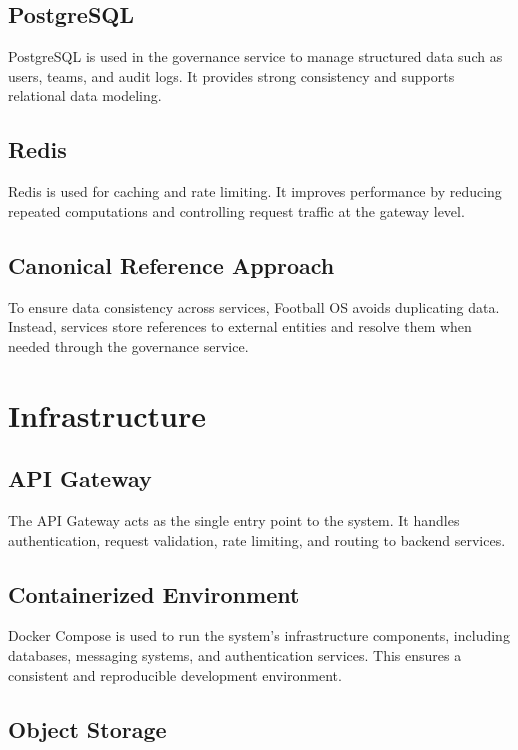 \subsection{PostgreSQL}

PostgreSQL is used in the governance service to manage structured data
such as users, teams, and audit logs. It provides strong consistency
and supports relational data modeling.

\subsection{Redis}

Redis is used for caching and rate limiting. It improves performance by
reducing repeated computations and controlling request traffic at the
gateway level.

\subsection{Canonical Reference Approach}

To ensure data consistency across services, Football OS avoids duplicating
data. Instead, services store references to external entities and resolve
them when needed through the governance service.

\section{Infrastructure}

\subsection{API Gateway}

The API Gateway acts as the single entry point to the system. It handles
authentication, request validation, rate limiting, and routing to backend
services.

\subsection{Containerized Environment}

Docker Compose is used to run the system's infrastructure components,
including databases, messaging systems, and authentication services.
This ensures a consistent and reproducible development environment.

\subsection{Object Storage}

